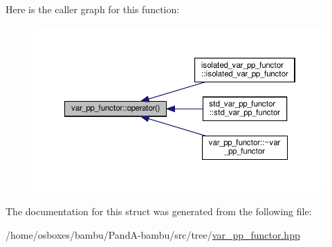 Here is the caller graph for this function\+:
\nopagebreak
\begin{figure}[H]
\begin{center}
\leavevmode
\includegraphics[width=350pt]{d5/d1f/structvar__pp__functor_a6bcbd4e1551ac2584638ef70ecc6f361_icgraph}
\end{center}
\end{figure}


The documentation for this struct was generated from the following file\+:\begin{DoxyCompactItemize}
\item 
/home/osboxes/bambu/\+Pand\+A-\/bambu/src/tree/\hyperlink{var__pp__functor_8hpp}{var\+\_\+pp\+\_\+functor.\+hpp}\end{DoxyCompactItemize}
